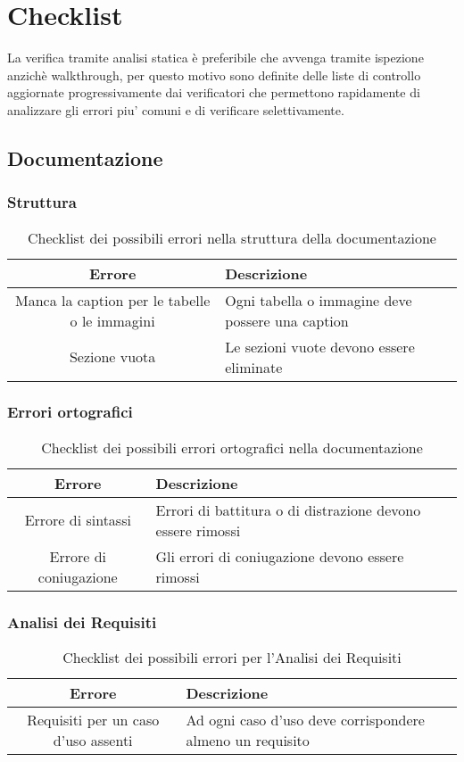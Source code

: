 \section{Checklist}
La verifica tramite analisi statica è preferibile che avvenga tramite ispezione anzichè walkthrough, per questo motivo sono definite delle liste di controllo aggiornate progressivamente dai verificatori che permettono rapidamente di analizzare gli errori piu' comuni e di verificare selettivamente.

\subsection{Documentazione}
\subsubsection{Struttura}
\begin{table}[h]
\centering
\begin{tabular}{|c|p{8cm}|}
\hline
\textbf{Errore} & \textbf{Descrizione} \\
\hline
Manca la caption per le tabelle o le immagini &  Ogni tabella o immagine deve possere una caption\\
\hline
Sezione vuota & Le sezioni vuote devono essere eliminate\\
\hline
\end{tabular}
\caption{Checklist dei possibili errori nella struttura della documentazione}
\end{table}

\subsubsection{Errori ortografici}
\begin{table}[h]
\centering
\begin{tabular}{|c|p{8cm}|}
\hline
\textbf{Errore} & \textbf{Descrizione} \\
\hline
Errore di sintassi &  Errori di battitura o di distrazione devono essere rimossi\\
\hline
Errore di coniugazione & Gli errori di coniugazione devono essere rimossi\\
\hline
\end{tabular}
\caption{Checklist dei possibili errori ortografici nella documentazione}
\end{table}

\subsubsection{Analisi dei Requisiti}
\begin{table}[h]
\centering
\begin{tabular}{|c|p{8cm}|}
\hline
\textbf{Errore} & \textbf{Descrizione} \\
\hline
Requisiti per un caso d'uso assenti &  Ad ogni caso d'uso deve corrispondere almeno un requisito\\
\hline
\end{tabular}
\caption{Checklist dei possibili errori per l'Analisi dei Requisiti}
\end{table}